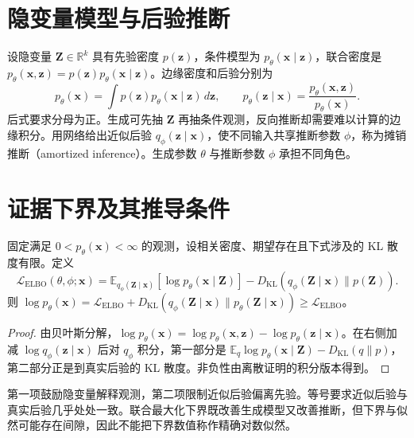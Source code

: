 \documentclass[UTF8,12pt,a4paper,fontset=fandol]{ctexbook}
\begin{document}
\section{隐变量模型与后验推断}
设隐变量 $\mathbf Z\in\mathbb R^k$ 具有先验密度 $p(\mathbf z)$，条件模型为 $p_\theta(\mathbf x\mid\mathbf z)$，联合密度是 $p_\theta(\mathbf x,\mathbf z)=p(\mathbf z)p_\theta(\mathbf x\mid\mathbf z)$。边缘密度和后验分别为
\[
p_\theta(\mathbf x)=\int p(\mathbf z)p_\theta(\mathbf x\mid\mathbf z)\,d\mathbf z,
\qquad p_\theta(\mathbf z\mid\mathbf x)=\frac{p_\theta(\mathbf x,\mathbf z)}{p_\theta(\mathbf x)}.
\]
后式要求分母为正。生成可先抽 $\mathbf Z$ 再抽条件观测，反向推断却需要难以计算的边缘积分。用网络给出近似后验 $q_\phi(\mathbf z\mid\mathbf x)$，使不同输入共享推断参数 $\phi$，称为摊销推断（amortized inference）。生成参数 $\theta$ 与推断参数 $\phi$ 承担不同角色。

\section{证据下界及其推导条件}
\begin{proposition}[ELBO 分解]
固定满足 $0<p_\theta(\mathbf x)<\infty$ 的观测，设相关密度、期望存在且下式涉及的 KL 散度有限。定义
\begin{equation}
\mathcal L_{\mathrm{ELBO}}(\theta,\phi;\mathbf x)
=\mathbb E_{q_\phi(\mathbf Z\mid\mathbf x)}[\log p_\theta(\mathbf x\mid\mathbf Z)]
-D_{\mathrm{KL}}(q_\phi(\mathbf Z\mid\mathbf x)\|p(\mathbf Z)).
\label{eq:dl-elbo}
\end{equation}
则 $\log p_\theta(\mathbf x)=\mathcal L_{\mathrm{ELBO}}+D_{\mathrm{KL}}(q_\phi(\mathbf Z\mid\mathbf x)\|p_\theta(\mathbf Z\mid\mathbf x))\geq\mathcal L_{\mathrm{ELBO}}$。
\end{proposition}
\begin{proof}
由贝叶斯分解，$\log p_\theta(\mathbf x)=\log p_\theta(\mathbf x,\mathbf z)-\log p_\theta(\mathbf z\mid\mathbf x)$。在右侧加减 $\log q_\phi(\mathbf z\mid\mathbf x)$ 后对 $q_\phi$ 积分，第一部分是 $\mathbb E_q\log p_\theta(\mathbf x\mid\mathbf Z)-D_{\mathrm{KL}}(q\|p)$，第二部分正是到真实后验的 KL 散度。非负性由离散证明的积分版本得到。
\end{proof}
第一项鼓励隐变量解释观测，第二项限制近似后验偏离先验。等号要求近似后验与真实后验几乎处处一致。联合最大化下界既改善生成模型又改善推断，但下界与似然可能存在间隙，因此不能把下界数值称作精确对数似然。
\end{document}

